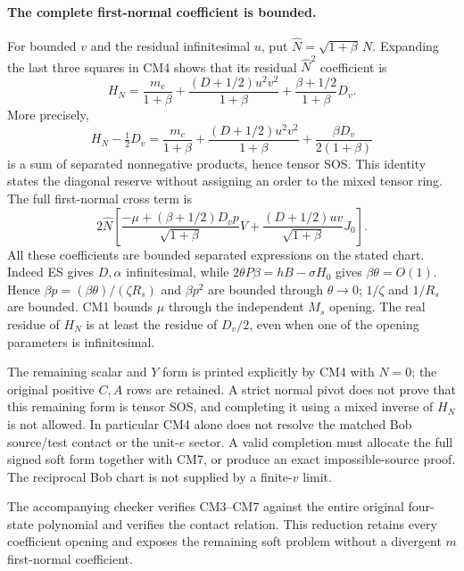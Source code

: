 \paragraph{The complete first-normal coefficient is bounded.}
For bounded $v$ and the residual infinitesimal $u$, put
$\widehat N=\sqrt{1+\beta}\,N$. Expanding the last three squares
in CM4 shows that its residual $\widehat N^2$ coefficient is
\[
 H_N=\frac{m_c}{1+\beta}
  +\frac{(D+1/2)u^2v^2}{1+\beta}
  +\frac{\beta+1/2}{1+\beta}D_v.
 \tag{CM6}
\]
More precisely,
\[
 H_N-\tfrac12D_v
 =\frac{m_c}{1+\beta}
  +\frac{(D+1/2)u^2v^2}{1+\beta}
  +\frac{\beta D_v}{2(1+\beta)}
\]
is a sum of separated nonnegative products, hence tensor SOS. This
identity states the diagonal reserve without assigning an order to
the mixed tensor ring.
The full first-normal cross term is
\[
 2\widehat N\left[
 \frac{-\mu+(\beta+1/2)D_vp}{\sqrt{1+\beta}}V
 +\frac{(D+1/2)uv}{\sqrt{1+\beta}}J_0\right].\tag{CM7}
\]
All these coefficients are bounded separated expressions on the stated
chart. Indeed ES gives $D,\alpha$ infinitesimal, while
$2\theta P\beta=hB-\sigma H_0$ gives $\beta\theta=O(1)$.
Hence $\beta p=(\beta\theta)/(\zeta R_s)$ and $\beta p^2$
are bounded through $\theta\to0$; $1/\zeta$ and $1/R_s$ are
bounded. CM1 bounds $\mu$ through the independent $M_s$ opening.
The real residue of $H_N$ is at least the residue of $D_v/2$, even
when one of the opening parameters is infinitesimal.

The remaining scalar and $Y$ form is printed explicitly by CM4 with
$N=0$; the original positive $C,A$ rows are retained. A strict normal
pivot does not prove that this remaining form is tensor SOS, and
completing it using a mixed inverse of $H_N$ is not allowed. In particular
CM4 alone does not resolve the matched Bob source/test contact or the
unit-$e$ sector. A valid completion must allocate the full signed soft
form together with CM7, or produce an exact impossible-source proof.
The reciprocal Bob chart is not supplied by a finite-$v$ limit.

The accompanying checker verifies CM3--CM7 against the entire original
four-state polynomial and verifies the contact relation. This reduction
retains every coefficient opening and exposes the remaining soft problem
without a divergent $m$ first-normal coefficient.

